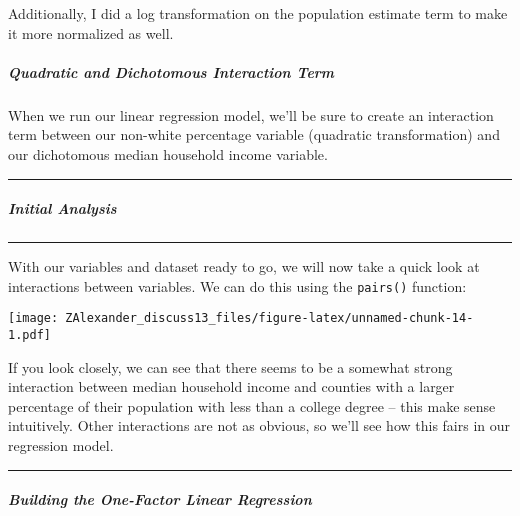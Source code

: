 \documentclass[
]{article}
\newenvironment{Shaded}{\begin{snugshade}}{\end{snugshade}}
\newcommand{\KeywordTok}[1]{\textcolor[rgb]{0.13,0.29,0.53}{\textbf{#1}}}
\newcommand{\NormalTok}[1]{#1}
\newcommand{\OperatorTok}[1]{\textcolor[rgb]{0.81,0.36,0.00}{\textbf{#1}}}
\newcommand{\StringTok}[1]{\textcolor[rgb]{0.31,0.60,0.02}{#1}}
\begin{document}
Additionally, I did a log transformation on the population estimate term
to make it more normalized as well.

\hypertarget{quadratic-and-dichotomous-interaction-term}{%
\subparagraph{Quadratic and Dichotomous Interaction
Term}\label{quadratic-and-dichotomous-interaction-term}}

When we run our linear regression model, we'll be sure to create an
interaction term between our non-white percentage variable (quadratic
transformation) and our dichotomous median household income variable.

\begin{center}\rule{0.5\linewidth}{0.5pt}\end{center}

\hypertarget{initial-analysis}{%
\subparagraph{Initial Analysis}\label{initial-analysis}}

\begin{center}\rule{0.5\linewidth}{0.5pt}\end{center}

With our variables and dataset ready to go, we will now take a quick
look at interactions between variables. We can do this using the
\texttt{pairs()} function:

\begin{Shaded}
\end{Shaded}

\texttt{[image: ZAlexander\_discuss13\_files/figure-latex/unnamed-chunk-14-1.pdf]}

If you look closely, we can see that there seems to be a somewhat strong
interaction between median household income and counties with a larger
percentage of their population with less than a college degree -- this
make sense intuitively. Other interactions are not as obvious, so we'll
see how this fairs in our regression model.

\begin{center}\rule{0.5\linewidth}{0.5pt}\end{center}

\hypertarget{building-the-one-factor-linear-regression}{%
\subparagraph{Building the One-Factor Linear
Regression}\label{building-the-one-factor-linear-regression}}
\end{document}

